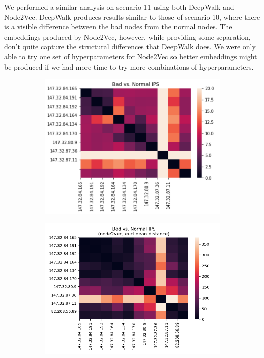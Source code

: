 \documentclass[10pt]{article}
\begin{document}
\begin{multicols}{2}
We performed a similar analysis on scenario 11 using both DeepWalk and Node2Vec. DeepWalk produces results similar to those of scenario 10, where there is a visible difference between the bad nodes from the normal nodes. The embeddings produced by Node2Vec, however, while providing some separation, don't quite capture the structural differences that DeepWalk does. We were only able to try one set of hyperparameters for Node2Vec so better embeddings might be produced if we had more time to try more combinations of hyperparameters. 

\begin{figure}[H]
\centering
\begin{subfigure}[b]{0.55\textwidth}
   \includegraphics[scale=.7]{2a}
   \caption{}
   \label{fig:Ng1} 
\end{subfigure}

\begin{subfigure}[b]{0.55\textwidth}
   \includegraphics[scale=.5]{2b}
   \caption{}
   \label{fig:Ng2}
\end{subfigure}


\end{figure}
\end{multicols}
\end{document}
